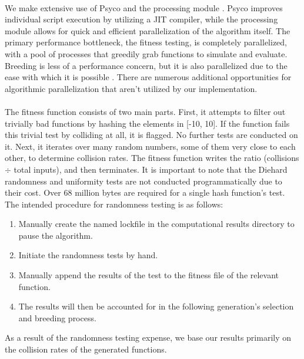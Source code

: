 \documentclass{article}
\begin{document}
\paragraph{}
We make extensive use of Psyco \cite{Psyco} and the processing module \cite{Processing}. Psyco improves individual script execution by utilizing a JIT compiler, while the processing module allows for quick and efficient parallelization of the algorithm itself.
The primary performance bottleneck, the fitness testing, is completely parallelized, with a pool of processes that greedily grab functions to simulate and evaluate. Breeding is less of a performance concern, but it is also parallelized due to the ease with which it is possible \cite{Mallya}. There are numerous additional opportunities for algorithmic parallelization that aren't utilized by our implementation.

\paragraph{}
The fitness function consists of two main parts. First, it attempts to filter out trivially bad functions by hashing the elements in [-10, 10]. If the function fails this trivial test by colliding at all, it is flagged. No further tests are conducted on it.
Next, it iterates over many random numbers, some of them very close to each other, to determine collision rates.
The fitness function writes the ratio (collisions $\div$ total inputs), and then terminates.
It is important to note that the Diehard \cite{Diehard} randomness and uniformity tests are not conducted programmatically due to their cost. Over 68 million bytes are required for a single hash function's test. The intended procedure for randomness testing is as follows:
\begin{enumerate}
	\item Manually create the named lockfile in the computational results directory to pause the algorithm.
	\item Initiate the randomness tests by hand.
	\item Manually append the results of the test to the fitness file of the relevant function. 
	\item The results will then be accounted for in the following generation's selection and breeding process.
\end{enumerate}

As a result of the randomness testing expense, we base our results primarily on the collision rates of the generated functions.
\end{document}
